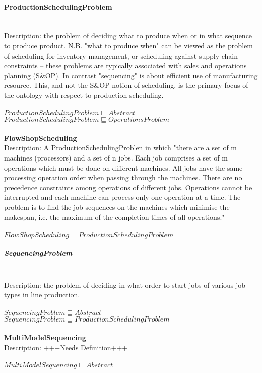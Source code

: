 \paragraph{ProductionSchedulingProblem}\\
Description: the problem of deciding what to produce when or in what sequence to produce product. N.B. "what to produce when" can be viewed as the problem of scheduling for inventory management, or scheduling against supply chain constraints -- these problems are typically associated with sales and operations planning (S&OP). In contrast "sequencing" is about efficient use of manufacturing resource. This, and not the S&OP notion of scheduling, is the primary focus of the ontology with respect to production scheduling.\\
\\$ ProductionSchedulingProblem \sqsubseteq Abstract$
\\$ ProductionSchedulingProblem \sqsubseteq OperationsProblem$
\\\\   \textbf{FlowShopScheduling}\\Description: A ProductionSchedulingProblen in which "there are a set of m machines (processors) and a set of n jobs. Each job comprises a set of m operations which must be done on different machines. All jobs have the same processing operation order when passing through the machines. There are no precedence constraints among operations of different jobs. Operations cannot be interrupted and each machine can process only one operation at a time. The problem is to find the job sequences on the machines which minimise the makespan, i.e. the maximum of the completion times of all operations." \cite{Seda2007}\\
\\$ FlowShopScheduling \sqsubseteq ProductionSchedulingProblem$
\subparagraph{SequencingProblem}\\
Description: the problem of deciding in what order to start jobs of various job types in line production.\\
\\$ SequencingProblem \sqsubseteq Abstract$
\\$ SequencingProblem \sqsubseteq ProductionSchedulingProblem$
\\\\   \textbf{MultiModelSequencing}\\Description: +++Needs Definition+++\\
\\$ MultiModelSequencing \sqsubseteq Abstract$
